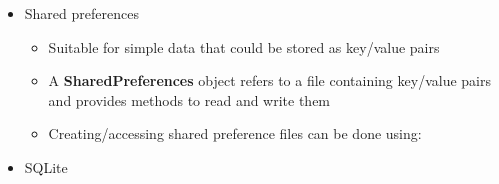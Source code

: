 \documentclass[11pt]{article}
\begin{document}
\begin{itemize}
	\item Shared preferences
		\begin{itemize}
			\item Suitable for simple data that could be stored as key/value pairs
			\item A \textbf{SharedPreferences} object refers to a file containing key/value pairs and provides methods to read and write them
			\item Creating/accessing shared preference files can be done using:
		\end{itemize}

	\item SQLite


\end{itemize}
\end{document}

